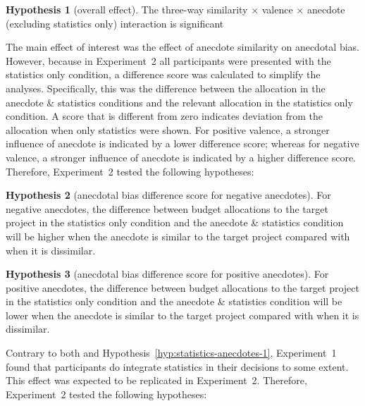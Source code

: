 \documentclass[a4paper, nobind]{templates/ociamthesis}
\theoremstyle{definition}
\theoremstyle{definition}
\theoremstyle{definition}
\theoremstyle{definition}
\newtheorem{hypothesis}{Hypothesis}[chapter]
\theoremstyle{remark}
\begin{document}
\begin{hypothesis}[overall effect]
\protect\hypertarget{hyp:three-way-anecdotes-2}{}{\label{hyp:three-way-anecdotes-2} \iffalse (overall effect) \fi{} }The three-way similarity \(\times\) valence \(\times\) anecdote (excluding
statistics only) interaction is significant
\end{hypothesis}

The main effect of interest was the effect of anecdote similarity on anecdotal
bias. However, because in Experiment~2 all participants were presented with the
statistics only condition, a difference score was calculated to simplify the
analyses. Specifically, this was the difference between the allocation in the
anecdote \& statistics conditions and the relevant allocation in the statistics
only condition. A score that is different from zero indicates deviation from the
allocation when only statistics were shown. For positive valence, a stronger
influence of anecdote is indicated by a lower difference score; whereas for
negative valence, a stronger influence of anecdote is indicated by a higher
difference score. Therefore, Experiment~2 tested the following hypotheses:

\begin{hypothesis}[anecdotal bias difference score for negative anecdotes]
\protect\hypertarget{hyp:anecdote-similarity-negative-anecdotes-2}{}{\label{hyp:anecdote-similarity-negative-anecdotes-2} \iffalse (anecdotal bias difference score for negative anecdotes) \fi{} }For negative anecdotes, the difference between budget allocations to the target
project in the statistics only condition and the anecdote \& statistics condition
will be higher when the anecdote is similar to the target project compared with
when it is dissimilar.
\end{hypothesis}

\begin{hypothesis}[anecdotal bias difference score for positive anecdotes]
\protect\hypertarget{hyp:anecdote-similarity-positive-anecdotes-2}{}{\label{hyp:anecdote-similarity-positive-anecdotes-2} \iffalse (anecdotal bias difference score for positive anecdotes) \fi{} }For positive anecdotes, the difference between budget allocations to the target
project in the statistics only condition and the anecdote \& statistics condition
will be lower when the anecdote is similar to the target project compared with
when it is dissimilar.
\end{hypothesis}

Contrary to both \textcite{wainberg2013} and Hypothesis~\ref{hyp:statistics-anecdotes-1},
Experiment~1 found that participants do integrate statistics in their decisions
to some extent. This effect was expected to be replicated in Experiment~2.
Therefore, Experiment~2 tested the following hypotheses:
\end{document}

